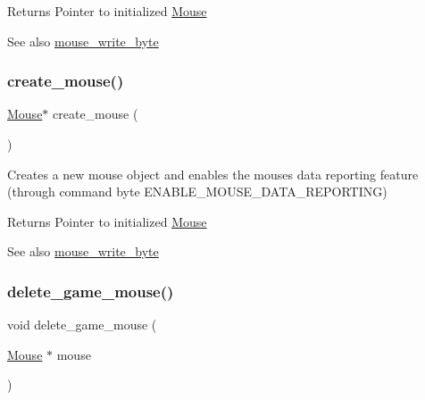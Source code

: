 \begin{DoxyReturn}{Returns}
Pointer to initialized \hyperlink{struct_mouse}{Mouse} 
\end{DoxyReturn}
\begin{DoxySeeAlso}{See also}
\hyperlink{group__mouse_gae4dd0dac34bd9ca58faf21a9f181a00d}{mouse\+\_\+write\+\_\+byte} 
\end{DoxySeeAlso}
\hypertarget{group__mouse_ga746cb478532b016b28ad06f8e03b22bc}{}\label{group__mouse_ga746cb478532b016b28ad06f8e03b22bc} 
\subsubsection{\texorpdfstring{create\+\_\+mouse()}{create\_mouse()}}
{\footnotesize\ttfamily \hyperlink{struct_mouse}{Mouse}$\ast$ create\+\_\+mouse (\begin{DoxyParamCaption}{ }\end{DoxyParamCaption})}



Creates a new mouse \textquotesingle{}object\textquotesingle{} and enables the mouse\textquotesingle{}s data reporting feature (through command byte E\+N\+A\+B\+L\+E\+\_\+\+M\+O\+U\+S\+E\+\_\+\+D\+A\+T\+A\+\_\+\+R\+E\+P\+O\+R\+T\+I\+NG) 

\begin{DoxyReturn}{Returns}
Pointer to initialized \hyperlink{struct_mouse}{Mouse} 
\end{DoxyReturn}
\begin{DoxySeeAlso}{See also}
\hyperlink{group__mouse_gae4dd0dac34bd9ca58faf21a9f181a00d}{mouse\+\_\+write\+\_\+byte} 
\end{DoxySeeAlso}
\hypertarget{group__mouse_ga85ab65df1f1de5af9bdc7c96827c9d37}{}\label{group__mouse_ga85ab65df1f1de5af9bdc7c96827c9d37} 
\subsubsection{\texorpdfstring{delete\+\_\+game\+\_\+mouse()}{delete\_game\_mouse()}}
{\footnotesize\ttfamily void delete\+\_\+game\+\_\+mouse (\begin{DoxyParamCaption}\item[{\hyperlink{struct_mouse}{Mouse} $\ast$}]{mouse }\end{DoxyParamCaption})}



